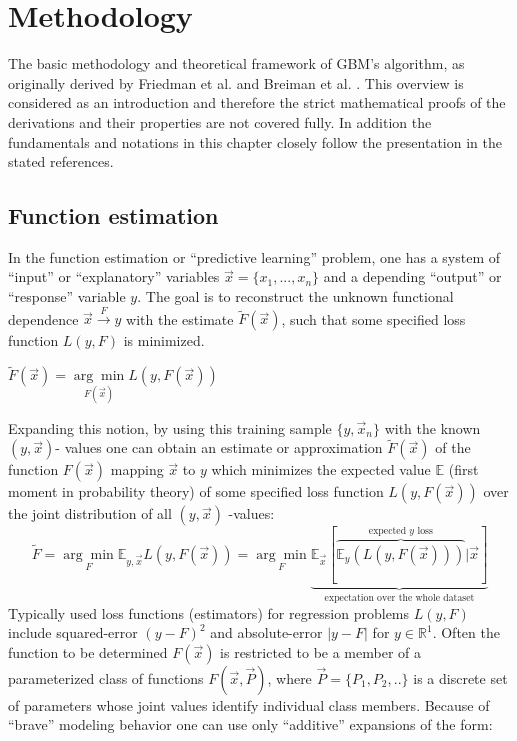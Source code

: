 \documentclass[12pt, a4paper]{article}
\begin{document}
\newpage
\section{Methodology}
The basic methodology and theoretical framework of GBM's algorithm, as originally derived by Friedman et al. \cite{Friedman2001} and Breiman et al. \cite{Breiman1984}. This overview is considered as an introduction and therefore the strict mathematical proofs of the derivations and their properties are not covered fully. In addition the fundamentals and notations in this chapter closely follow the presentation in the stated references.
\subsection{Function estimation}
In the function estimation or ``predictive learning'' problem, one has a system of ``input'' or ``explanatory'' variables $\vec{x} = \{x_1,...,x_n\}$ and a depending ``output'' or ``response'' variable $y$. The goal is to reconstruct the unknown functional dependence $\vec{x} \xrightarrow{F} y$ with the estimate $\tilde{F}(\vec{x})$, such that some specified loss function $L(y,F)$ is minimized.
\begin{center}
    $\tilde{F}(\vec{x}) = \underset{F(\vec{x})}{\arg\min} L(y,F(\vec{x}))$
\end{center}
Expanding this notion, by using this training sample $\{y,\vec{x}_n\}$ with the known $(y,\vec{x})$- values one can obtain an estimate or approximation $\tilde{F}(\vec{x})$ of the function $F(\vec{x})$ mapping $\vec{x}$ to $y$ which minimizes the expected value $\mathbb{E}$ (first moment in probability theory) of some specified loss function $L(y,F(\vec{x}))$ over the joint distribution of all $(y,\vec{x})$ -values:
\begin{equation}
    \tilde{F} = \underset{F}{\arg\min} \mathbb{E}_{y,\vec{x}} L(y,F(\vec{x})) = \underset{F}{\arg\min} \underbrace{\mathbb{E}_{\vec{x}} [\overbrace{\mathbb{E}_y (L(y,F(\vec{x})))}^\text{expected $y$ loss}|\vec{x}]}_\text{expectation over the whole dataset}
\end{equation}
Typically used loss functions (estimators) for regression problems $L(y,F)$ include squared-error $(y - F)^2$ and absolute-error $|y - F|$ for $y \in \mathbb{R}^1$.
Often the function to be determined $F(\vec{x})$ is restricted to be a member of a parameterized class of functions $F(\vec{x},\vec{P})$, where $\vec{P} = \{P_1,P_2,..\}$ is a discrete set of parameters whose joint values identify individual class members. Because of ``brave'' modeling behavior one can use only ``additive'' expansions of the form:
\end{document}
